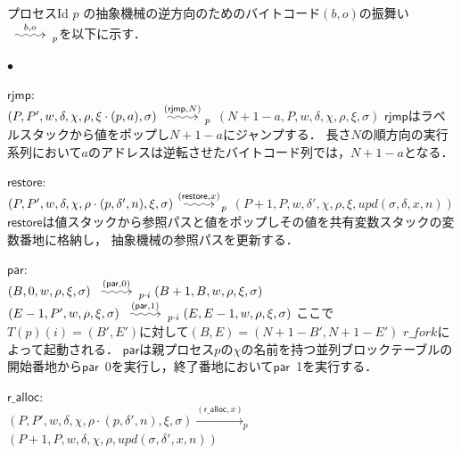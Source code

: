 \documentclass[submit,PRO]{ipsj}
\makeatletter
\newcommand{\longsquiggly}{\xymatrix{{}\ar@{~>}[r]&{}}}
\newcommand{\bcode}[1]{$\mathsf{#1}$}
\newcommand{\brightarrow}[1]{\stackrel{#1}{\longsquiggly}}
\makeatother
\begin{document}
プロセスId $p$ の抽象機械の逆方向のためのバイトコード$(b,o)$の振舞い
$\brightarrow{b,o}_{p}$を以下に示す．

\begin{list}%
 {$\bullet$} %
 {} %
 \item \bcode{rjmp}:\\
$(P,P',w,\delta,\chi,\rho,\xi\cdot(p,a),\sigma)\brightarrow{(\mathsf{rjmp},N)}_p$\newline
\qquad$(N+1-a,P,w,\delta,\chi,\rho,\xi,\sigma)$\newline
\bcode{rjmp}はラベルスタックから値をポップし$N+1-a$にジャンプする．
長さ$N$の順方向の実行系列において$a$のアドレスは逆転させたバイトコード列では，$N+1-a$となる．
\item \bcode{restore}:\\
$(P,P',w,\delta,\chi,\rho\cdot(p,\delta',n),\xi,\sigma)\brightarrow{(\mathsf{restore},x)}_p$\newline
\qquad$(P+1,P,w,\delta',\chi,\rho,\xi,upd(\sigma,\delta,x,n))$\newline
\bcode{restore}は値スタックから参照パスと値をポップしその値を共有変数スタックの変数番地に格納し，
抽象機械の参照パスを更新する．
\item \bcode{par}:\\
$(B,0,w,\rho,\xi,\sigma)\brightarrow{(\mathsf{par},0)}_{p\cdot i}(B+1,B,w,\rho,\xi,\sigma)$\newline
$(E-1,P',w,\rho,\xi,\sigma)\brightarrow{(\mathsf{par},1)}_{p\cdot i}(E,E-1,w,\rho,\xi,\sigma)$\newline
ここで$T(p)(i)=(B',E')$に対して$(B,E)=(N+1-B',N+1-E')$ $r\_fork$によって起動される．
\bcode{par}は親プロセス$p$の$\chi$の名前を持つ並列ブロックテーブルの開始番地から\bcode{par}\ 0を実行し，終了番地において\bcode{par}\ 1を実行する．
\item \bcode{r\_alloc}:\\\relax
$(P,P',w,\delta,\chi,\rho\cdot(p,\delta',n),\xi,\sigma)\xrightarrow{(\mathsf{r\_alloc},x)}_p$\newline
\qquad $(P+1,P,w,\delta,\chi,\rho,upd(\sigma,\delta',x,n))$\newline

\end{list}
\end{document}
